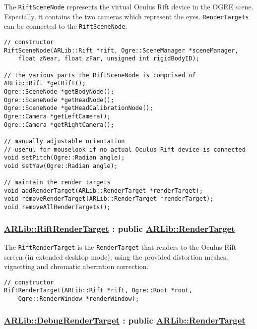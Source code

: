 The \texttt{RiftSceneNode} represents the virtual Oculus Rift device in the OGRE
scene. Especially, it contains the two cameras which represent the eyes.
\texttt{RenderTargets} can be connected to the \texttt{RiftSceneNode}.

\begin{lstlisting}
// constructor
RiftSceneNode(ARLib::Rift *rift, Ogre::SceneManager *sceneManager,
    float zNear, float zFar, unsigned int rigidBodyID);

// the various parts the RiftSceneNode is comprised of
ARLib::Rift *getRift();
Ogre::SceneNode *getBodyNode();
Ogre::SceneNode *getHeadNode();
Ogre::SceneNode *getHeadCalibrationNode();
Ogre::Camera *getLeftCamera();
Ogre::Camera *getRightCamera();

// manually adjustable orientation
// useful for mouselook if no actual Oculus Rift device is connected
void setPitch(Ogre::Radian angle);
void setYaw(Ogre::Radian angle);

// maintain the render targets
void addRenderTarget(ARLib::RenderTarget *renderTarget);
void removeRenderTarget(ARLib::RenderTarget *renderTarget);
void removeAllRenderTargets();
\end{lstlisting}

\subsubsection{\texorpdfstring{\href{https://github.com/ands/OculusMeetsAR/blob/master/ARLib/include/ARLib/Ogre/RiftRenderTarget.h}{ARLib::RiftRenderTarget}
: public
\href{https://github.com/ands/OculusMeetsAR/blob/master/ARLib/include/ARLib/Ogre/RenderTarget.h}{ARLib::RenderTarget}}{ARLib::RiftRenderTarget : public ARLib::RenderTarget}}\label{arlibriftrendertarget-public-arlibrendertarget}

The \texttt{RiftRenderTarget} is the \texttt{RenderTarget} that renders to the Oculus Rift
screen (in extended desktop mode), using the provided distortion meshes,
vignetting and chromatic aberration correction.

\begin{lstlisting}
// constructor
RiftRenderTarget(ARLib::Rift *rift, Ogre::Root *root,
    Ogre::RenderWindow *renderWindow);
\end{lstlisting}

\subsubsection{\texorpdfstring{\href{https://github.com/ands/OculusMeetsAR/blob/master/ARLib/include/ARLib/Ogre/DebugRenderTarget.h}{ARLib::DebugRenderTarget}
: public
\href{https://github.com/ands/OculusMeetsAR/blob/master/ARLib/include/ARLib/Ogre/RenderTarget.h}{ARLib::RenderTarget}}{ARLib::DebugRenderTarget : public ARLib::RenderTarget}}\label{arlibdebugrendertarget-public-arlibrendertarget}

